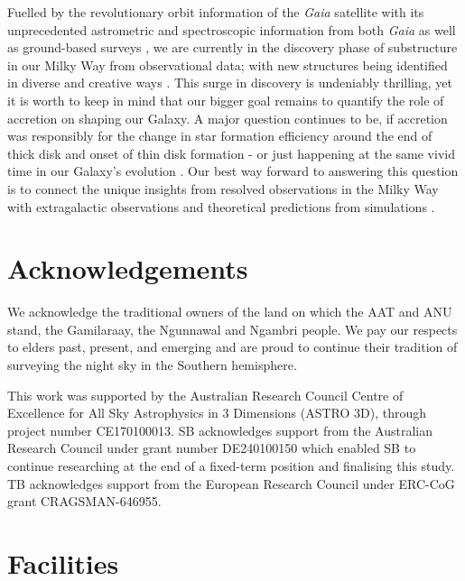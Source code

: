 \documentclass[fleqn,usenatbib]{mnras}
\begin{document}
Fuelled by the revolutionary orbit information of the \textit{Gaia} satellite \citep{Brown2016, Brown2018, Brown2021, Vallenari2023} with its unprecedented astrometric \citep{Lindegren2016, Lindegren2018, Lindegren2021a} and spectroscopic information from both \textit{Gaia} \citep{Katz2019, Katz2022} as well as ground-based surveys \citep[e.g.][]{SDSSDR17, Buder2021, Zhao2012, Conroy2019}, we are currently in the discovery phase of substructure in our Milky Way from observational data; with new structures being identified in diverse and creative ways \citep[e.g.][]{Naidu2021, Malhan2024}. This surge in discovery is undeniably thrilling, yet it is worth to keep in mind that our bigger goal remains to quantify the role of accretion on shaping our Galaxy. A major question continues to be, if accretion was responsibly for the change in star formation efficiency around the end of thick disk and onset of thin disk formation \citep{Conroy2022} - or just happening at the same vivid time in our Galaxy's evolution \citep[see the reviews by][for more extensive discussions]{Helmi2020, Deason2024}. Our best way forward to answering this question is to connect the unique insights from resolved observations in the Milky Way with extragalactic observations and theoretical predictions from simulations \citep[see e.g.][]{GECKOS2023}.

\section*{Acknowledgements}

We acknowledge the traditional owners of the land on which the AAT and ANU stand, the Gamilaraay, the Ngunnawal and Ngambri people. We pay our respects to elders past, present, and emerging and are proud to continue their tradition of surveying the night sky in the Southern hemisphere.

This work was supported by the Australian Research Council Centre of Excellence for All Sky Astrophysics in 3 Dimensions (ASTRO 3D), through project number CE170100013. SB acknowledges support from the Australian Research Council under grant number DE240100150 which enabled SB to continue researching at the end of a fixed-term position and finalising this study. TB acknowledges support from the European Research Council under ERC-CoG grant CRAGSMAN-646955.

\section*{Facilities}
\end{document}
